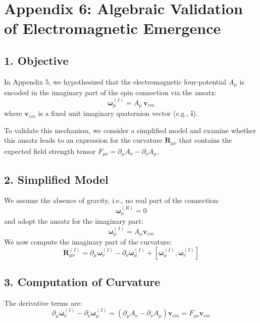 
\section*{Appendix 6: Algebraic Validation of Electromagnetic Emergence}

\subsection*{1. Objective}

In Appendix 5, we hypothesized that the electromagnetic four-potential \( A_\mu \) is encoded in the imaginary part of the spin connection via the ansatz:
\[
\boldsymbol{\omega}_{\mu}^{(I)} = A_\mu \, \mathbf{v}_{em}
\]
where \( \mathbf{v}_{em} \) is a fixed unit imaginary quaternion vector (e.g., \( \mathbf{i} \)).

To validate this mechanism, we consider a simplified model and examine whether this ansatz leads to an expression for the curvature \( \mathbf{R}_{\mu\nu} \) that contains the expected field strength tensor \( F_{\mu\nu} = \partial_\mu A_\nu - \partial_\nu A_\mu \).

\subsection*{2. Simplified Model}

We assume the absence of gravity, i.e., no real part of the connection:
\[
\boldsymbol{\omega}_\mu^{(R)} = 0
\]
and adopt the ansatz for the imaginary part:
\[
\boldsymbol{\omega}_\mu^{(I)} = A_\mu \mathbf{v}_{em}
\]
We now compute the imaginary part of the curvature:
\[
\mathbf{R}_{\mu\nu}^{(I)} = \partial_\mu \boldsymbol{\omega}_\nu^{(I)} - \partial_\nu \boldsymbol{\omega}_\mu^{(I)} + [\boldsymbol{\omega}_\mu^{(I)}, \boldsymbol{\omega}_\nu^{(I)}]
\]

\subsection*{3. Computation of Curvature}

The derivative terms are:
\[
\partial_\mu \boldsymbol{\omega}_\nu^{(I)} - \partial_\nu \boldsymbol{\omega}_\mu^{(I)} = (\partial_\mu A_\nu - \partial_\nu A_\mu) \mathbf{v}_{em} = F_{\mu\nu} \mathbf{v}_{em}
\]

